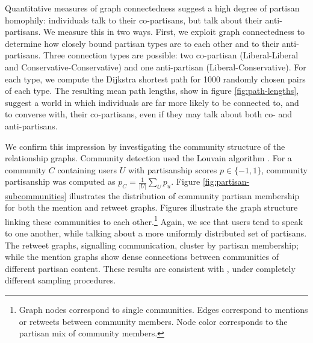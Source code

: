 \documentclass{acm_proc_article-sp}
\begin{document}
Quantitative measures of graph connectedness suggest a high degree of
partisan homophily: individuals talk to their co-partisans, but talk
about their anti-partisans. We measure this in two ways. First, we
exploit graph connectedness to determine how closely bound partisan
types are to each other and to their anti-partisans. Three connection
types are possible: two co-partisan (Liberal-Liberal and
Conservative-Conservative) and one anti-partisan
(Liberal-Conservative). For each type, we compute the Dijkstra
shortest path for 1000 randomly chosen pairs of each type. The resulting
mean path lengths, show in figure \ref{fig:path-lengths}, suggest a world in which
individuals are far more likely to be connected to, and to converse
with, their co-partisans, even if they may talk about both co- and
anti-partisans.

We confirm this impression by investigating the community structure of
the relationship graphs. Community detection used the Louvain
algorithm \cite{blondel2008fast}. For a community $C$ containing
users $U$ with partisanship scores $p \in \{-1, 1\}$, community partisanship was computed
as $p_C = \frac{1}{\left|U\right|}\sum_U p_u$. Figure
\ref{fig:partisan-subcommunities} 
illustrates the distribution of community partisan membership
for both the mention and retweet graphs. Figures
 illustrate the graph
structure linking these communities to each other.\footnote{Graph
  nodes correspond to single communities. Edges correspond to mentions
or retweets between community members. Node color corresponds to the
partisan mix of community members.} Again, we see that users tend
to speak to one another, while talking about a more uniformly
distributed set of partisans. The retweet graphs, signalling
communication, cluster by partisan membership; while the mention
graphs show dense connections between communities of different
partisan content. These results are consistent with
\cite{conover2011}, under completely different sampling procedures. 



\end{document}
